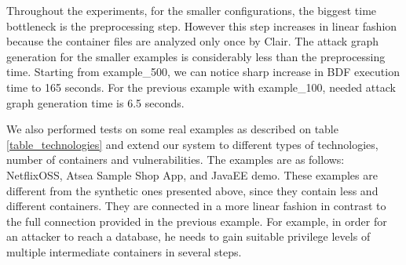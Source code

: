 Throughout the experiments, for the smaller configurations, the biggest time bottleneck is the preprocessing step. However this step increases in linear fashion because the container files are analyzed only once by Clair. The attack graph generation for the smaller examples is considerably less than the preprocessing time. Starting from example\_500, we can notice sharp increase in BDF execution time to 165 seconds. For the previous example with example\_100, needed attack graph generation time is 6.5 seconds.

We also performed tests on some real examples as described on table \ref{table_technologies} and extend our system to different types of technologies, number of containers and vulnerabilities. The examples are as follows: NetflixOSS, Atsea Sample Shop App, and JavaEE demo. These examples are different from the synthetic ones presented above, since they contain less and different containers. They are connected in a more linear fashion in contrast to the full connection provided in the previous example. For example, in order for an attacker to reach a database, he needs to gain suitable privilege levels of multiple intermediate containers in several steps.

